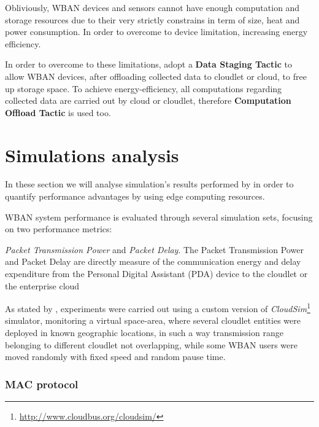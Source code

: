 \documentclass[sigchi]{acmart}
\begin{document}
\vspace{0.3cm}

Obliviously, WBAN devices and sensors cannot have enough computation and storage resources due to their very strictly constrains in term of size, heat and power consumption. In order to overcome to device limitation, increasing energy efficiency.

In order to overcome to these limitations, \citet{MSAReport} adopt a \textbf{Data Staging Tactic} to allow WBAN devices, after oﬄoading
collected data to cloudlet or cloud, to free up storage space. To achieve energy-efficiency, all computations regarding collected data 
are carried out by cloud or cloudlet, therefore \textbf{Computation Offload Tactic} is used too.


\section{Simulations analysis}

In these section we will analyse simulation's results performed by \citet{MSAReport} in order to quantify performance advantages by using edge computing resources. 

WBAN system performance is evaluated through several simulation sets, focusing on two performance metrics:

\vspace{0.3cm}

\begin{quoting}[font=itshape, begintext={``}, endtext={''\cite[par.~4.2]{MSAReport}}]
\textit{Packet Transmission Power} and \textit{Packet Delay}. The Packet Transmission Power and Packet Delay are directly measure of the communication energy and delay expenditure from the Personal Digital Assistant (PDA) device to the cloudlet or the enterprise cloud
\end{quoting}

\vspace{0.3cm}

As stated by \citet{MSAReport}, experiments were carried out using a custom version of \textit{CloudSim}\footnote{\url{http://www.cloudbus.org/cloudsim/}} simulator, monitoring a virtual space-area, where several cloudlet entities were deployed in known geographic locations, in such a way transmission range belonging to different cloudlet not overlapping, while some WBAN users were moved randomly with fixed speed and random pause time.

\subsubsection{MAC protocol}
\end{document}

